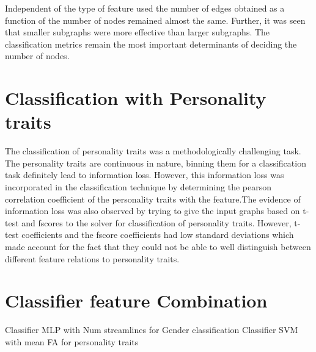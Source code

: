 \documentclass[msthesis.tex]{subfiles}
\begin{document}
Independent of the type of feature used the number of edges obtained as a function of the number of nodes remained almost the same. Further, it was seen that smaller subgraphs were more effective than larger subgraphs. The classification metrics remain the most important determinants of deciding the number of nodes. 

\section{Classification with Personality traits}
The classification of personality traits was a methodologically challenging task. The personality traits are continuous in nature, binning them for a classification task definitely lead to information loss. However, this information loss was incorporated in the classification technique by determining the pearson correlation coefficient of the personality traits with the feature.The evidence of information loss was also observed by trying to give the input graphs based on t-test and fscores to the solver for classification of personality traits. However, t-test coefficients and the fscore coefficients had low standard deviations which made account for the fact that they could not be able to well distinguish between different feature relations to personality traits. 
\section{Classifier feature Combination}
Classifier MLP with Num streamlines for Gender classification
Classifier SVM with mean FA for personality traits
\end{document}
